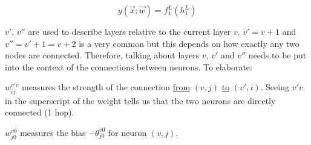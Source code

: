 \begin{frame}
{\begin{equation}
y(\vec x;\vec w) = f^L_1(h^L_1)
\end{equation}

$v'$, $v''$ are used to describe layers relative to the current layer $v$. $v'=v+1$ and $v''=v'+1=v+2$ is a very common but this depends on how exactly any two nodes are connected. Therefore, talking about layers $v$, $v'$ and $v''$ needs to be put into the context of the connections between neurons. To elaborate:

$w_{ij}^{v'v}$ measures the strength of the connection \underline{from} $(v,j)$ \underline{to} $(v',i)$. Seeing $v'v$ in the superscript of the weight tells us that the two neurons are directly connected (1 hop).

$w_{j0}^{v0}$ measures the bias $-\theta_{j0}^{v0}$ for neuron $(v,j)$. 

}

\end{frame}

